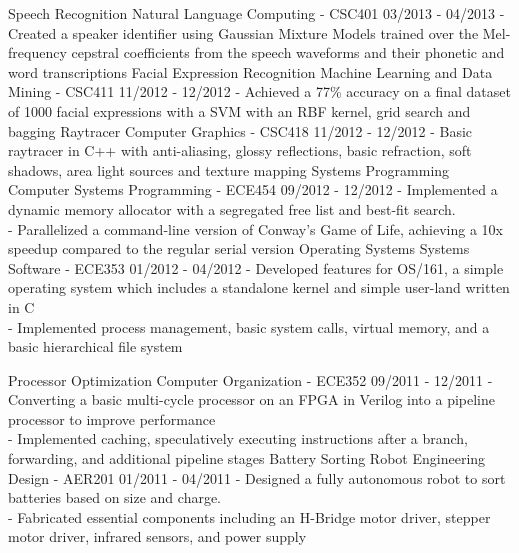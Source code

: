 \documentclass[]{friggeri-cv}
\begin{document}
\begin{entrylist}
  \entry
    {Speech Recognition}
    {Natural Language Computing - CSC401}
    {03/2013 - 04/2013}
    {- Created a speaker identifier using Gaussian Mixture Models trained over the Mel-frequency cepstral coefficients from the speech waveforms  and their phonetic and word transcriptions}
  \entry
    {Facial Expression Recognition}
    {Machine Learning and Data Mining - CSC411}
    {11/2012 - 12/2012}
    {- Achieved a 77\% accuracy on a final dataset of 1000 facial expressions with a SVM with an RBF kernel, grid search and bagging}
  \entry
    {Raytracer}
    {Computer Graphics - CSC418}
    {11/2012 - 12/2012}
    {- Basic raytracer in C++ with anti-aliasing, glossy reflections, basic refraction, soft shadows, area light sources and texture mapping}
  \entry
    {Systems Programming}
    {Computer Systems Programming - ECE454}
    {09/2012 - 12/2012}
    {- Implemented a dynamic memory allocator with a segregated free list and best-fit search.\\ 
    - Parallelized a command-line version of Conway’s Game of Life, achieving a 10x speedup compared to the regular serial version}
  \entry
    {Operating Systems}
    {Systems Software - ECE353}
    {01/2012 - 04/2012}
    {- Developed  features  for OS/161, a simple operating  system  which includes a standalone kernel and simple user-land  written in C\\
    - Implemented process management, basic system  calls, virtual memory, and a basic hierarchical file system}
    
  \entry
    {Processor Optimization}
    {Computer Organization - ECE352}
    {09/2011 - 12/2011}
    {- Converting a basic multi-cycle processor on an FPGA in Verilog into a pipeline processor to improve performance\\
    - Implemented caching, speculatively executing instructions after a branch, forwarding, and additional pipeline stages}
  \entry
    {Battery Sorting Robot}
    {Engineering Design - AER201}
    {01/2011 - 04/2011}
    {- Designed a fully autonomous robot to sort batteries based on size and charge.\\
    - Fabricated  essential components including an H-Bridge motor driver, stepper motor driver, infrared sensors, and power supply}
\end{entrylist}


\end{document}
